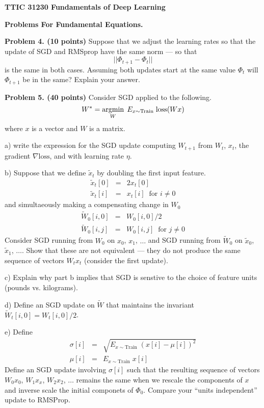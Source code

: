 \documentclass{article}
\begin{document}
\centerline{\bf TTIC 31230 Fundamentals of Deep Learning}
\bigskip
\centerline{\bf Problems For Fundamental Equations.}

\bigskip
\bigskip
{\bf Problem 4. (10 points)} Suppose that we adjust the learning rates so that the update of SGD and RMSprop have the same norm --- so that
$$||\Phi_{t+1} - \Phi_t||$$ is the same in both cases.  Assuming both updates start at the same value $\Phi_t$ will $\Phi_{t+1}$
be in the same?  Explain your answer.

{\bf Problem 5. (40 points)} Consider SGD applied to the following.
$$W^* = \operatorname*{argmin}_W\; E_{x\sim \mathrm{Train}}\;\mathrm{loss}(W x)$$
where $x$ is a vector and $W$ is a matrix.

a) write the expression for the SGD update computing $W_{t+1}$ from $W_t$, $x_t$, the gradient $\nabla \mathrm{loss}$, and with learning rate $\eta$.

b) Suppose that we define $\tilde{x}_t$ by doubling the first input feature.
\begin{eqnarray*}
\tilde{x}_t[0] & = & 2x_t[0] \\
\tilde{x}_t[i] & = & x_t[i]\;\;\mbox{for $i \not = 0$}
\end{eqnarray*}
and simultaeously making a compensating change in $W_0$
\begin{eqnarray*}
  \tilde{W}_0[i,0] & = & W_0[i,0]/2 \\
        \tilde{W}_0[i,j] & = & W_0[i,j]\;\;\mbox{for $j \not = 0$}
\end{eqnarray*}
Consider SGD running from $W_0$ on $x_0$, $x_1$, $\ldots$ and SGD running from $\tilde{W}_0$ on $\tilde{x}_0$, $\tilde{x}_1$, $\ldots$.
Show that these are not equivalent --- they do not produce the same sequence of vectors $W_tx_t$ (consider the first update).

c) Explain why part b implies that SGD is senstive to the choice of feature units (pounds vs. kilograms).

d) Define an SGD update on $\tilde{W}$ that maintains the invariant $\tilde{W}_t[i,0] = W_t[i,0]/2$.

e) Define
\begin{eqnarray*}
  \sigma[i] & = & \sqrt{E_{x \sim \mathrm{Train}}\;(x[i] - \mu[i])^2} \\
  \mu[i] & = & E_{x \sim \mathrm{Train}}\;x[i]
\end{eqnarray*}
Define an SGD update involving $\sigma[i]$ such that the resulting sequence of vectors $W_0 x_0$, $W_1 x_x$, $W_2 x_2$, $\ldots$ remains the same when
we rescale the components of $x$ and inverse scale the initial componets of $\Phi_0$.  Compare your ``units independent''
update to RMSProp.
\end{document}
